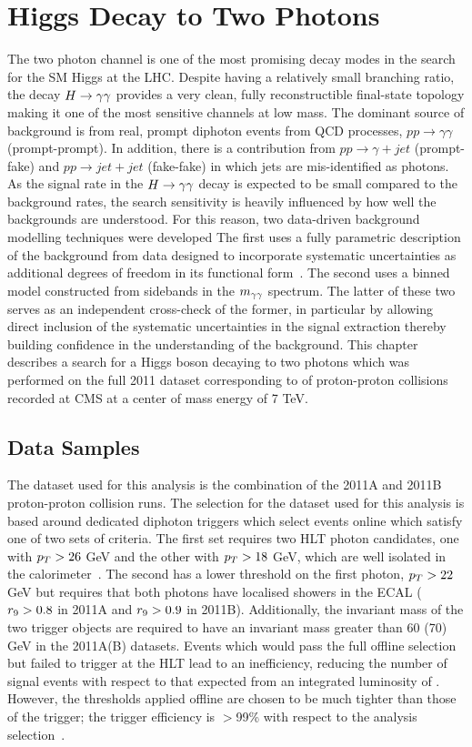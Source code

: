 \chapter{Higgs Decay to Two Photons}
\label{chap:hgg}

The two photon channel is one of the most promising decay modes in the search for the SM Higgs
at the LHC. Despite having a relatively small branching ratio, the decay $H\rightarrow\gamma\gamma$ 
provides a very clean, fully reconstructible final-state topology making it 
one of the most sensitive channels at low mass.
The dominant source of background is from real, prompt diphoton events from QCD 
processes, $pp\rightarrow\gamma\gamma$ (prompt-prompt).
In addition, there is a contribution from $pp\rightarrow\gamma+jet$ (prompt-fake) and 
$pp\rightarrow jet+jet$ (fake-fake) in which jets are mis-identified as photons. 
As the signal rate in the $H\rightarrow\gamma\gamma$ decay is expected to be small compared to the background rates,
the search sensitivity is heavily influenced by how well the backgrounds are understood.
For this reason, two data-driven background modelling techniques were developed
The first uses a fully parametric
description of the background from data designed to incorporate systematic uncertainties as additional degrees of 
freedom in its functional form~\cite{HIG-11-033}. The second uses a binned model constructed from 
sidebands in the $m_{\gamma\gamma}$ spectrum. The latter of these two serves as an independent cross-check of the former,
in particular by allowing direct inclusion of the systematic uncertainties in the signal extraction thereby
building confidence in the understanding of the background. 
This chapter describes a search for a Higgs boson decaying to two photons
which was performed on the full 2011 dataset corresponding to \clumi of proton-proton collisions 
recorded at CMS at a center of mass energy of 7 TeV.

\section{Data Samples}
\label{sec:datasamples}

The dataset used for this analysis is the combination of the 2011A and 2011B 
proton-proton collision runs.
The selection for the dataset used for this analysis is based around dedicated diphoton triggers
which select events online which satisfy one of two sets of criteria.
The first set requires two HLT photon candidates, one with $p_{T}>26$ GeV and the other with 
$p_{T}>18$ GeV, which are well isolated in the calorimeter~\cite{AN-12-048}. The second has a lower threshold on
the first photon, $p_{T}>22$ GeV but requires that both photons have localised showers in the ECAL 
($r_{9}>0.8$ in 2011A and $r_{9}>0.9$ in 2011B). 
Additionally, the invariant mass of the two trigger objects are required to have an 
invariant mass greater than 60 (70) GeV in the 2011A(B) datasets.
Events which would pass the full offline selection but failed to trigger at the HLT lead to an inefficiency, 
reducing the number of signal events with respect to that expected from an integrated luminosity of \clumi.
However, the thresholds applied offline are chosen to be much tighter than those of the trigger;
the trigger efficiency is $>$99\% with respect to the analysis selection~\cite{AN-12-048}. 

